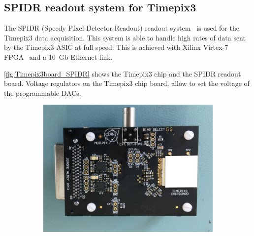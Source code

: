 \subsection{SPIDR readout system for Timepix3}
\label{sec:TimepixReadout}

The SPIDR (Speedy PIxel Detector Readout) readout
system~\cite{Visser:2015bsa} is used for the Timepix3 data
acquisition. This system is able to handle high rates of data sent by
the Timepix3 ASIC at full speed. This is achieved with Xilinx Virtex-7
FPGA~\cite{XilinxVirtex7} and a 10~Gb Ethernet link.

\cref{fig:Timepix3board_SPIDR} shows the Timepix3 chip and the SPIDR
readout board. Voltage regulators on the Timepix3 chip board, allow to
set the voltage of the programmable DACs.

\begin{figure}[htbp] \centering
  \begin{subfigure}[b]{0.3\textwidth}
    \includegraphics[width=\textwidth]{./figures/Calibration/Timepix3board2.jpg}
    \caption{}\label{fig:Timepix3board_PCB}
  \end{subfigure}\hfill
  \begin{subfigure}[b]{0.65\textwidth}

\end{subfigure}
\end{figure}
